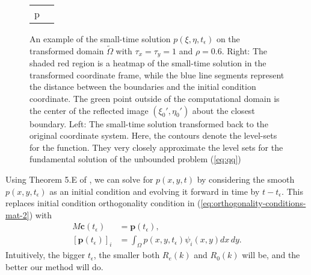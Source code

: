 \begin{figure}
  \centering
  \begin{tabular}{cc}
    \begin{minipage}{0.5\textwidth}
      \centering
    \end{minipage}p
    & \begin{minipage}{0.5\textwidth}
      \centering
    \end{minipage}
  \end{tabular}
  \caption{An example of the small-time solution
    $p(\xi,\eta,t_\epsilon)$ on the transformed domain
    $\tilde{\Omega}$ with $\tau_x = \tau_y = 1$ and $\rho=0.6$. Right:
    The shaded red region is a heatmap of the small-time solution in
    the transformed coordinate frame, while the blue line segments
    represent the distance between the boundaries and the initial
    condition coordinate. The green point outside of the computational
    domain is the center of the reflected image $(\xi_0', \eta_0')$
    about the closest boundary. Left: The small-time solution
    transformed back to the original coordinate system. Here, the
    contours denote the level-sets for the function. They very closely
    approximate the level sets for the fundamental solution of the
    unbounded problem (\ref{eq:qq})}
  \label{fig:step-1-small-time}
\end{figure}
Using Theorem 5.E of \cite{zeidler1995applied}, we can solve for
$p(x,y,t)$ by considering the smooth $p(x,y,t_\epsilon)$ as an initial
condition and evolving it forward in time by $t-t_\epsilon$. This
replaces initial condition orthogonality condition in
(\ref{eq:orthogonality-conditions-mat-2}) with
\begin{align}
  M \mathbf{c}(t_\epsilon) &= \mathbf{p}(t_\epsilon), \\
   [\mathbf{p}(t_\epsilon)]_i &= \displaystyle \int_\Omega p(x,y,t_\epsilon) \psi_i(x,y) dx\,dy. \nonumber
\end{align}
Intuitively, the bigger $t_\epsilon$, the smaller both $R_e(k)$ and
$R_0(k)$ will be, and the better our method will do.


